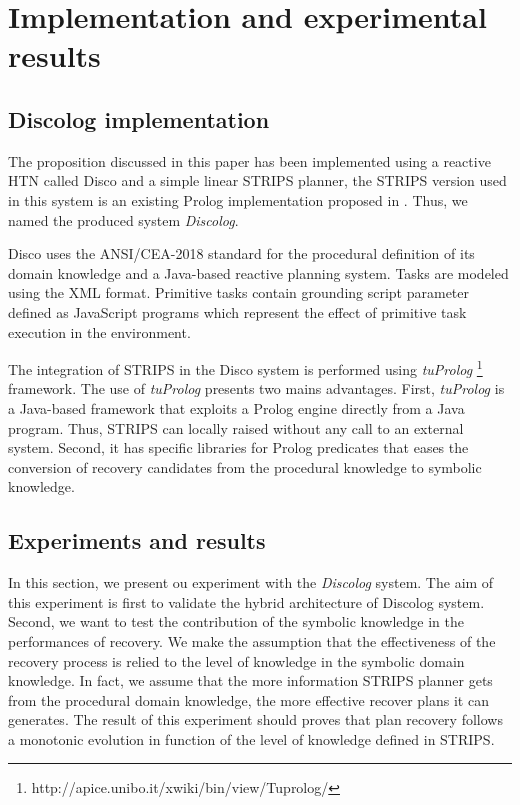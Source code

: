 \documentclass[conference]{IEEEtran}
\begin{document}
	\section{Implementation and experimental results}
	\subsection{Discolog implementation}
	\par The proposition discussed in this paper has been implemented using a reactive HTN called  Disco \cite{rich2009building} and a simple linear STRIPS planner, the STRIPS version used in this system is an existing  Prolog implementation proposed in \cite{poole1998computational}. Thus, we named the produced system \emph{Discolog}. 
	\par  Disco uses the ANSI/CEA-2018 standard for the procedural definition of its domain knowledge and a Java-based reactive planning system. Tasks are modeled using the XML format. Primitive tasks contain grounding script parameter defined	as JavaScript programs which represent the effect of  primitive task execution in the environment. 
	\par  The integration of STRIPS in the Disco system is performed using  \emph{tuProlog} \footnote{http://apice.unibo.it/xwiki/bin/view/Tuprolog/} framework. The use of  \emph{tuProlog} presents two mains advantages. First, \emph{tuProlog} is a Java-based framework that exploits a Prolog engine directly from a Java program. Thus, STRIPS can locally raised without any call to an external system. Second, it has specific libraries for  Prolog predicates that eases the conversion of recovery candidates from the procedural knowledge to symbolic knowledge. 
	\subsection{Experiments and results}
	\par  In this section, we present ou experiment with the \emph{Discolog} system. The aim of this  experiment is first to validate the hybrid architecture of Discolog system. Second, we want to test the contribution of the symbolic knowledge in the performances of recovery. We make the assumption that the effectiveness of the recovery process is relied to the level of knowledge in the symbolic domain knowledge. In fact, we assume that the more information STRIPS planner gets from the procedural domain knowledge, the more effective recover plans it can generates. The result of this experiment should proves that plan recovery follows a monotonic evolution in function of the level of knowledge defined in STRIPS.
	
\end{document}
